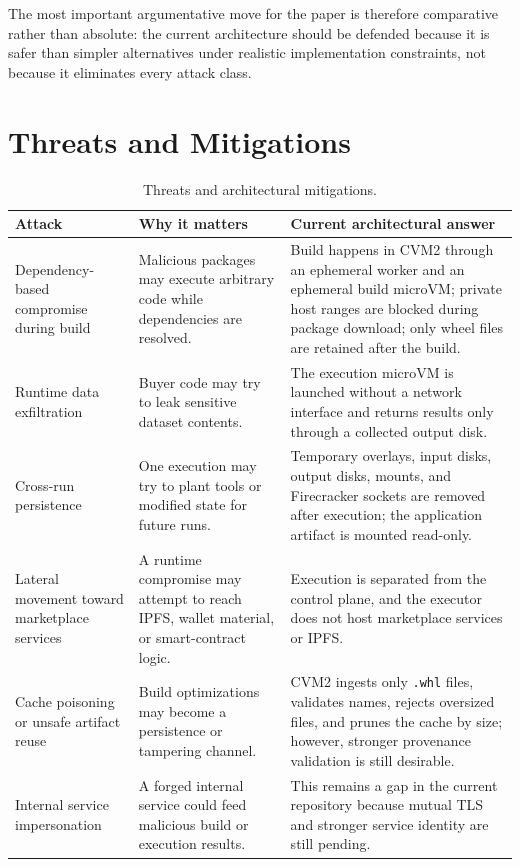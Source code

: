 \documentclass[sigconf,nonacm]{acmart}
\begin{document}
The most important argumentative move for the paper is therefore comparative rather than absolute: the current architecture should be defended because it is safer than simpler alternatives under realistic implementation constraints, not because it eliminates every attack class.

\FloatBarrier
{}
\section{Threats and Mitigations}

\begin{table}[t]
\centering
\caption{Threats and architectural mitigations.}
\label{tab:attacks}
\footnotesize
\begin{tabularx}{\textwidth}{@{}p{3.1cm}p{4.6cm}X@{}}
\toprule
Attack & Why it matters & Current architectural answer \\
\midrule
Dependency-based compromise during build & Malicious packages may execute arbitrary code while dependencies are resolved. & Build happens in CVM2 through an ephemeral worker and an ephemeral build microVM; private host ranges are blocked during package download; only wheel files are retained after the build. \\
\addlinespace
Runtime data exfiltration & Buyer code may try to leak sensitive dataset contents. & The execution microVM is launched without a network interface and returns results only through a collected output disk. \\
\addlinespace
Cross-run persistence & One execution may try to plant tools or modified state for future runs. & Temporary overlays, input disks, output disks, mounts, and Firecracker sockets are removed after execution; the application artifact is mounted read-only. \\
\addlinespace
Lateral movement toward marketplace services & A runtime compromise may attempt to reach IPFS, wallet material, or smart-contract logic. & Execution is separated from the control plane, and the executor does not host marketplace services or IPFS. \\
\addlinespace
Cache poisoning or unsafe artifact reuse & Build optimizations may become a persistence or tampering channel. & CVM2 ingests only \texttt{.whl} files, validates names, rejects oversized files, and prunes the cache by size; however, stronger provenance validation is still desirable. \\
\addlinespace
Internal service impersonation & A forged internal service could feed malicious build or execution results. & This remains a gap in the current repository because mutual TLS and stronger service identity are still pending. \\
\bottomrule
\end{tabularx}
\end{table}
\end{document}

